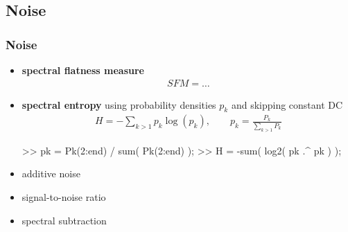 
\subsection{Noise}

\begin{frame}[fragile]
	\frametitle{Noise}
	\begin{itemize}
		\item \textbf{spectral flatness measure}
			\begin{align*}
				\mathit{SFM}=\ldots
			\end{align*}
		\item \textbf{spectral entropy} using probability densities $p_k$ and skipping constant DC
			\begin{align*}
				H=-\sum_{k>1}p_k\log(p_k),\qquad p_k=\frac{P_k}{\sum_{k>1}P_k}
			\end{align*}
			\begin{code}
>> pk = Pk(2:end) / sum( Pk(2:end) ); \color{medium}%
>> H = -sum( log2( pk .^ pk ) ); \color{medium}%
			\end{code}
		\item additive noise
		\item signal-to-noise ratio
		\item spectral subtraction
	\end{itemize}
\end{frame}


